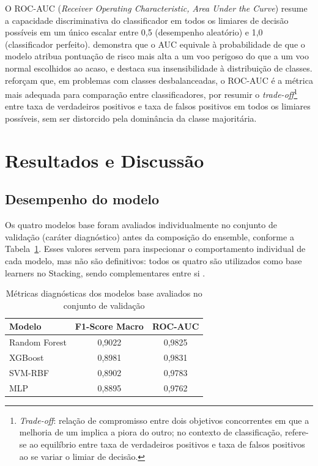\documentclass[english,brazilian]{UNISINOSartigo}
\begin{document}
O ROC-AUC (\textit{Receiver Operating Characteristic, Area Under the
Curve}) resume a capacidade discriminativa do classificador em todos os limiares
de decisão possíveis em um único escalar entre 0,5 (desempenho aleatório) e
1,0 (classificador perfeito).  demonstra que o AUC
equivale à probabilidade de que o modelo atribua pontuação de risco mais alta a
um voo perigoso do que a um voo normal escolhidos ao acaso, e destaca sua
insensibilidade à distribuição de classes.  reforçam que,
em problemas com classes desbalanceadas, o ROC-AUC é a métrica mais adequada
para comparação entre classificadores, por resumir o
\textit{trade-off}\footnote{\textit{Trade-off}: relação de compromisso entre
dois objetivos concorrentes em que a melhoria de um implica a piora do outro;
no contexto de classificação, refere-se ao equilíbrio entre taxa de verdadeiros
positivos e taxa de falsos positivos ao se variar o limiar de decisão.} entre
taxa de verdadeiros positivos e taxa de falsos positivos em todos os limiares
possíveis, sem ser distorcido pela dominância da classe majoritária.

\section{Resultados e Discussão}

\subsection{Desempenho do modelo}

Os quatro modelos base foram avaliados individualmente no conjunto de validação
(caráter diagnóstico) antes da composição do ensemble, conforme a Tabela~\ref{tab:modelos}.
Esses valores servem para inspecionar o comportamento individual de cada modelo,
mas não são definitivos: todos os quatro são utilizados como base learners no
Stacking, sendo complementares entre si \cite{WOLPERT1992}.

\begin{table}[ht]
  \caption{Métricas diagnósticas dos modelos base avaliados no conjunto de validação}
  \label{tab:modelos}
  \centering
  \begin{tabular}{lcc}
    \toprule
    \textbf{Modelo} & \textbf{F1-Score Macro} & \textbf{ROC-AUC} \\
    \midrule
    Random Forest  & 0,9022 & 0,9825 \\
    XGBoost        & 0,8981 & 0,9831 \\
    SVM-RBF        & 0,8902 & 0,9783 \\
    MLP            & 0,8895 & 0,9762 \\
    \bottomrule
  \end{tabular}
\end{table}
\end{document}

